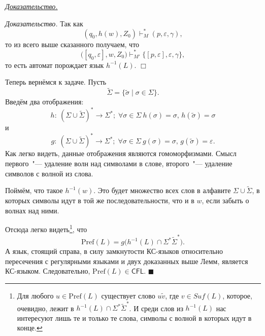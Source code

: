 \documentclass[10pt]{article}
\newcounter{pr} \setcounter{pr}{0}
\newenvironment{pruf}
  {\par
  {\itshape \underline{Доказательство.}}}
  {\hfill$\blacksquare$}
\newcounter{lem} \setcounter{lem}{0}
\newenvironment{lempruf}
  {\par
  {\itshape Доказательство.}}
  {\hfill$\Box$}
\newcommand{\eps}{\varepsilon}
\newcommand{\CFL}{\mathsf{CFL}}
\newcommand{\Pref}{\mathrm{Pref}}
\begin{document}
\begin{pr}
\begin{pruf}
\begin{lempruf}
        Так как
        \[
          (q_0, h(w), Z_0) \vdash_M^* (p, \eps, \gamma),
        \]
        то из всего выше сказанного получаем, что
        \[
          \big( [q_0, \eps], w, Z_0 \big) \vdash_{M'}^*
            \big\{ [p, \eps], \eps, \gamma \big\},
        \]
        то есть автомат порождает язык $h^{-1}(L)$.
      \end{lempruf}

      \bigskip
      Теперь вернёмся к задаче. Пусть
      \[
        \widetilde{\Sigma} = \{ \widetilde{\sigma} \mid \sigma \in \Sigma \}.
      \]
      Введём два отображения:
      \[
        h:\: (\Sigma \cup \widetilde{\Sigma})^* \rightarrow \Sigma^*;\;
          \forall \sigma \in \Sigma \
            h(\sigma) = \sigma,\,
            h(\widetilde{\sigma}) = \sigma
      \]
      и
      \[
        g:\: (\Sigma \cup \widetilde{\Sigma})^* \rightarrow \Sigma^*;\;
          \forall \sigma \in \Sigma \
            g(\sigma) = \sigma,\,
            g(\widetilde{\sigma}) = \eps.
      \]
      Как легко видеть, данные отображения являются гомоморфизмами. Смысл
      первого~"--- удаление волн над символами в слове, второго~"--- удаление
      символов с волной из слова.

      Поймём, что такое $h^{-1}(w)$. Это будет множество всех слов в алфавите
      $\Sigma \cup \widetilde{\Sigma}$, в которых символы идут в той же
      последовательности, что и в $w$, если забыть о волнах над ними.

      Отсюда легко видеть\footnote{Для любого $u \in \Pref(L)$ существует слово
      $u\widetilde{v}$, где $v \in Suf(L)$, которое, очевидно, лежит в
      $h^{-1}(L) \cap \Sigma^* \widetilde{\Sigma}^*$. И среди слов из
      $h^{-1}(L)$ нас интересуют лишь те и только те слова, символы с волной в
      которых идут в конце.}, что
      \[
        \Pref(L) = g\Big( h^{-1}(L) \cap \Sigma^* \widetilde{\Sigma}^* \Big).
      \]
      А язык, стоящий справа, в силу замкнутости
      КС-языков относительно пересечения с регулярными языками и двух доказанных
      выше Лемм, является КС-языком. Следовательно, $\Pref(L) \in \CFL$.
    \end{pruf}
  \end{pr}
\end{document}
